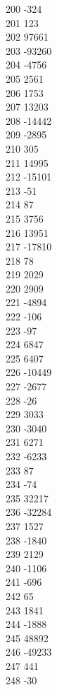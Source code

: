 { 200	-324 \\
 201	123 \\
 202	97661 \\
 203	-93260 \\
 204	-4756 \\
 205	2561 \\
 206	1753 \\
 207	13203 \\
 208	-14442 \\
 209	-2895 \\
 210	305 \\
 211	14995 \\
 212	-15101 \\
 213	-51 \\
 214	87 \\
 215	3756 \\
 216	13951 \\
 217	-17810 \\
 218	78 \\
 219	2029 \\
 220	2909 \\
 221	-4894 \\
 222	-106 \\
 223	-97 \\
 224	6847 \\
 225	6407 \\
 226	-10449 \\
 227	-2677 \\
 228	-26 \\
 229	3033 \\
 230	-3040 \\
 231	6271 \\
 232	-6233 \\
 233	87 \\
 234	-74 \\
 235	32217 \\
 236	-32284 \\
 237	1527 \\
 238	-1840 \\
 239	2129 \\
 240	-1106 \\
 241	-696 \\
 242	65 \\
 243	1841 \\
 244	-1888 \\
 245	48892 \\
 246	-49233 \\
 247	441 \\
 248	-30 \\
}
